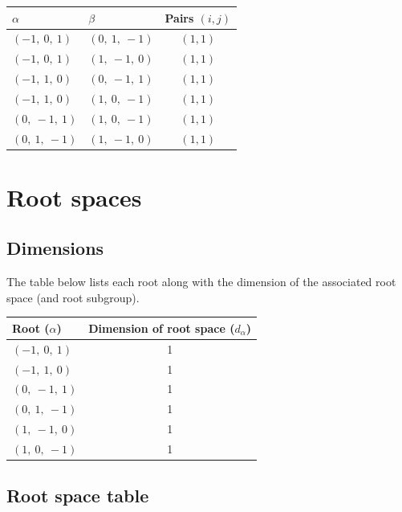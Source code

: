 \documentclass[11pt]{article}
\theoremstyle{definition}
\begin{document}
\begin{tabular}{|l|l|c|}
    \hline
    $\alpha$ & $\beta$ & Pairs $(i,j)$ \\
    \hline
    $\left( -1, \  0, \  1\right)$ & $\left( 0, \  1, \  -1\right)$ & $(1,1)$ \\
    \hline
    $\left( -1, \  0, \  1\right)$ & $\left( 1, \  -1, \  0\right)$ & $(1,1)$ \\
    \hline
    $\left( -1, \  1, \  0\right)$ & $\left( 0, \  -1, \  1\right)$ & $(1,1)$ \\
    \hline
    $\left( -1, \  1, \  0\right)$ & $\left( 1, \  0, \  -1\right)$ & $(1,1)$ \\
    \hline
    $\left( 0, \  -1, \  1\right)$ & $\left( 1, \  0, \  -1\right)$ & $(1,1)$ \\
    \hline
    $\left( 0, \  1, \  -1\right)$ & $\left( 1, \  -1, \  0\right)$ & $(1,1)$ \\
    \hline
\end{tabular}


\newpage
\section{Root spaces}

\subsection{Dimensions}

The table below lists each root along with the dimension of the associated root space (and root subgroup).

\bigskip

\noindent \begin{tabular}{|l|c|}
    \hline
    \textbf{Root ($\alpha$)} & \textbf{Dimension of root space ($d_{\alpha}$)} \\
    \hline
    $\left( -1, \  0, \  1\right)$ & 1 \\
    \hline
    $\left( -1, \  1, \  0\right)$ & 1 \\
    \hline
    $\left( 0, \  -1, \  1\right)$ & 1 \\
    \hline
    $\left( 0, \  1, \  -1\right)$ & 1 \\
    \hline
    $\left( 1, \  -1, \  0\right)$ & 1 \\
    \hline
    $\left( 1, \  0, \  -1\right)$ & 1 \\
    \hline
\end{tabular}


\subsection{Root space table}
\end{document}

